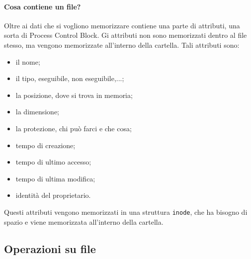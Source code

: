 \documentclass[a4paper, 12pt]{book}
\begin{document}
\paragraph{Cosa contiene un file?} Oltre ai dati 
che si vogliono memorizzare contiene una parte di attributi,
una sorta di Process Control Block. Gi attributi non sono 
memorizzati dentro al file stesso, ma vengono memorizzate 
all'interno della cartella. Tali attributi sono:
\begin{itemize}
    \item il nome;
    \item il tipo, eseguibile, non eseguibile,...;
    \item la posizione, dove si trova in memoria;
    \item la dimensione;
    \item la protezione, chi può farci e che cosa;
    \item tempo di creazione;
    \item tempo di ultimo accesso;
    \item tempo di ultima modifica;
    \item identità del proprietario.
\end{itemize}
Questi attributi vengono memorizzati in una struttura 
\verb|inode|, che ha bisogno di spazio e viene memorizzata 
all'interno della cartella.

\subsection{Operazioni su file}
\end{document}
